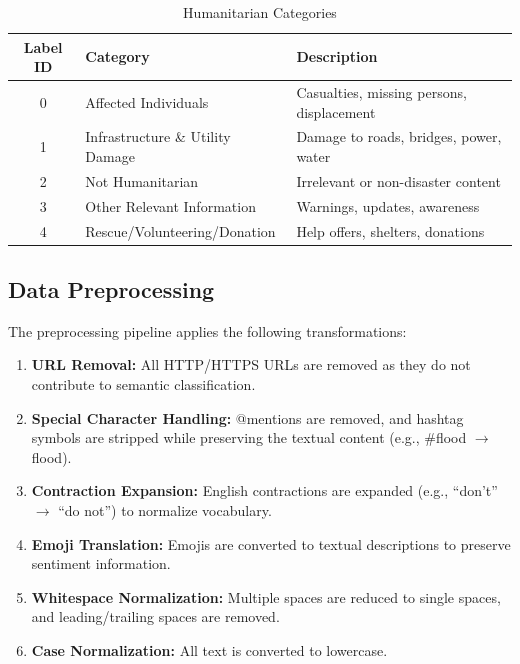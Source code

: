 \documentclass[pdflatex,sn-mathphys-num]{sn-jnl}%
\theoremstyle{thmstyleone}%
\theoremstyle{thmstyletwo}%
\theoremstyle{thmstylethree}%
\begin{document}
\begin{table}[h]
\centering
\caption{Humanitarian Categories}
\label{tab:labels}
\begin{tabular}{|c|l|l|}
\hline
\textbf{Label ID} & \textbf{Category} & \textbf{Description} \\
\hline
0 & Affected Individuals & Casualties, missing persons, displacement \\
1 & Infrastructure \& Utility Damage & Damage to roads, bridges, power, water \\
2 & Not Humanitarian & Irrelevant or non-disaster content \\
3 & Other Relevant Information & Warnings, updates, awareness \\
4 & Rescue/Volunteering/Donation & Help offers, shelters, donations \\
\hline
\end{tabular}
\end{table}

\subsection{Data Preprocessing}

The preprocessing pipeline applies the following transformations:

\begin{enumerate}
    \item \textbf{URL Removal:} All HTTP/HTTPS URLs are removed as they do not contribute to semantic classification.
    
    \item \textbf{Special Character Handling:} @mentions are removed, and hashtag symbols are stripped while preserving the textual content (e.g., \#flood $\rightarrow$ flood).
    
    \item \textbf{Contraction Expansion:} English contractions are expanded (e.g., ``don't'' $\rightarrow$ ``do not'') to normalize vocabulary.
    
    \item \textbf{Emoji Translation:} Emojis are converted to textual descriptions to preserve sentiment information.
    
    \item \textbf{Whitespace Normalization:} Multiple spaces are reduced to single spaces, and leading/trailing spaces are removed.
    
    \item \textbf{Case Normalization:} All text is converted to lowercase.
\end{enumerate}
\end{document}
